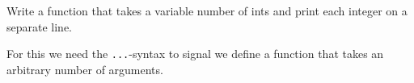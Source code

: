 \begin{Exercise}[title={Var args},difficulty=1]
\label{ex:varargs}
\Question\label{ex:varargs q1}
Write a function that takes a variable number of ints and print
each integer on a separate line.
\end{Exercise}

\begin{Answer}
\Question
For this we need the \lstinline{...}-syntax to signal we define a
function that takes an arbitrary number of arguments. 



\end{Answer}

